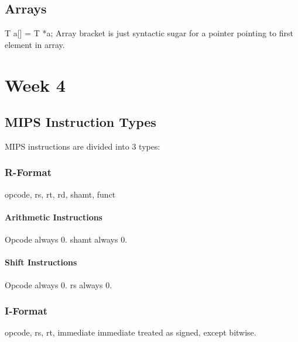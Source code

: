 \documentclass{article}
\begin{document}
\begin{multicols*}{3}
\subsection{Arrays}
T a[] = T *a;
Array bracket is just syntactic sugar for a pointer pointing to first element in array.
\section{Week 4}
\subsection{MIPS Instruction Types}
MIPS instructions are divided into 3 types:
\subsubsection{R-Format}
opcode, rs, rt, rd, shamt, funct
\paragraph{Arithmetic Instructions}
Opcode always 0.
shamt always 0.
\paragraph{Shift Instructions}
Opcode always 0.
rs always 0.
\subsubsection{I-Format}
opcode, rs, rt, immediate
immediate treated as signed, except bitwise.
\end{multicols*}
\end{document}
